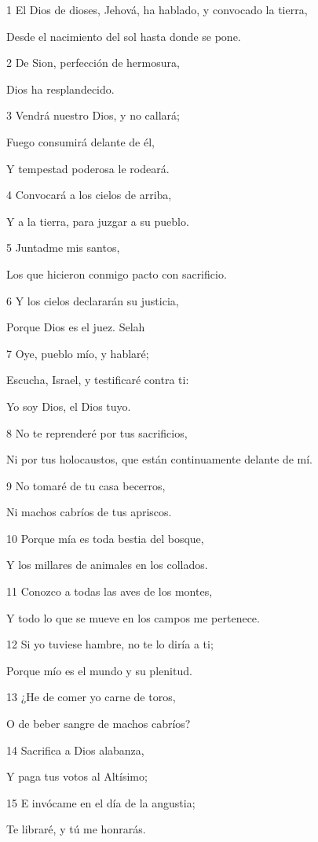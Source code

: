 \par 1 El Dios de dioses, Jehová, ha hablado, y convocado la tierra,
\par Desde el nacimiento del sol hasta donde se pone.
\par 2 De Sion, perfección de hermosura,
\par Dios ha resplandecido.
\par 3 Vendrá nuestro Dios, y no callará;
\par Fuego consumirá delante de él,
\par Y tempestad poderosa le rodeará.
\par 4 Convocará a los cielos de arriba,
\par Y a la tierra, para juzgar a su pueblo.
\par 5 Juntadme mis santos,
\par Los que hicieron conmigo pacto con sacrificio.
\par 6 Y los cielos declararán su justicia,
\par Porque Dios es el juez. Selah
\par 7 Oye, pueblo mío, y hablaré;
\par Escucha, Israel, y testificaré contra ti:
\par Yo soy Dios, el Dios tuyo.
\par 8 No te reprenderé por tus sacrificios,
\par Ni por tus holocaustos, que están continuamente delante de mí.
\par 9 No tomaré de tu casa becerros,
\par Ni machos cabríos de tus apriscos.
\par 10 Porque mía es toda bestia del bosque,
\par Y los millares de animales en los collados.
\par 11 Conozco a todas las aves de los montes,
\par Y todo lo que se mueve en los campos me pertenece.
\par 12 Si yo tuviese hambre, no te lo diría a ti;
\par Porque mío es el mundo y su plenitud.
\par 13 ¿He de comer yo carne de toros,
\par O de beber sangre de machos cabríos?
\par 14 Sacrifica a Dios alabanza,
\par Y paga tus votos al Altísimo;
\par 15 E invócame en el día de la angustia;
\par Te libraré, y tú me honrarás.
